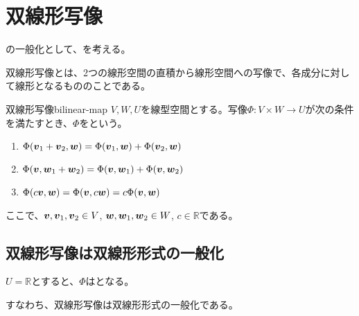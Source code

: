 \documentclass[../../../topic_linear-algebra]{subfiles}
\begin{document}
\sectionline
\section{双線形写像}

の一般化として、を考える。

\br

双線形写像とは、2つの線形空間の直積から線形空間への写像で、各成分に対して線形となるもののことである。

\begin{definition}{双線形写像}{bilinear-map}
  $V,W,U$を線型空間とする。写像$\Phi \colon V \times W \to U$が次の条件を満たすとき、$\Phi$をという。
  \begin{enumerate}[label=\romanlabel]
    \item $\Phi(\vb*{v}_1 + \vb*{v}_2, \vb*{w}) = \Phi(\vb*{v}_1, \vb*{w}) + \Phi(\vb*{v}_2, \vb*{w})$
    \item $\Phi(\vb*{v}, \vb*{w}_1 + \vb*{w}_2) = \Phi(\vb*{v}, \vb*{w}_1) + \Phi(\vb*{v}, \vb*{w}_2)$
    \item $\Phi(c\vb*{v}, \vb*{w}) = \Phi(\vb*{v}, c\vb*{w}) = c\Phi(\vb*{v}, \vb*{w})$
  \end{enumerate}
  ここで、$\vb*{v}, \vb*{v}_1, \vb*{v}_2 \in V$, $\vb*{w}, \vb*{w}_1, \vb*{w}_2 \in W$, $c \in \mathbb{R}$である。
\end{definition}

\subsection{双線形写像は双線形形式の一般化}

$U = \mathbb{R}$とすると、$\Phi$はとなる。

すなわち、双線形写像は双線形形式の一般化である。
\end{document}
